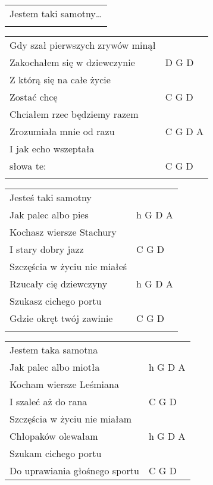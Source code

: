 \documentclass[a5paper]{article}
\begin{document}
\noindent
\begin{tabular}{@{}p{5.50cm}@{}}
Jestem taki samotny… \\ \\
\end{tabular}

\noindent
\begin{tabular}{@{}p{6.50cm}p{3cm}@{}}
	Gdy szał pierwszych zrywów minął & \\
	Zakochałem się w dziewczynie & D G D \\
	Z którą się na całe życie & \\
	Zostać chcę & C G D \\
	Chciałem rzec będziemy razem & \\
	Zrozumiała mnie od razu & C G D A \\
	I jak echo wszeptała & \\
	słowa te: & C G D \\ \\
\end{tabular}

\noindent
\begin{tabular}{@{}p{5.50cm}p{3cm}@{}}
Jesteś taki samotny & \\
Jak palec albo pies & h G D A \\
Kochasz wiersze Stachury & \\
I stary dobry jazz & C G D \\
Szczęścia w życiu nie miałeś & \\
Rzucały cię dziewczyny & h G D A \\
Szukasz cichego portu & \\
Gdzie okręt twój zawinie & C G D \\ \\
\end{tabular}

\noindent
\begin{tabular}{@{}p{5.50cm}p{3cm}@{}}
Jestem taka samotna & \\
Jak palec albo miotła & h G D A \\
Kocham wiersze Leśmiana & \\
I szaleć aż do rana & C G D \\
Szczęścia w życiu nie miałam & \\
Chłopaków olewałam & h G D A \\
Szukam cichego portu & \\
Do uprawiania głośnego sportu & C G D
\end{tabular}
\end{document}
